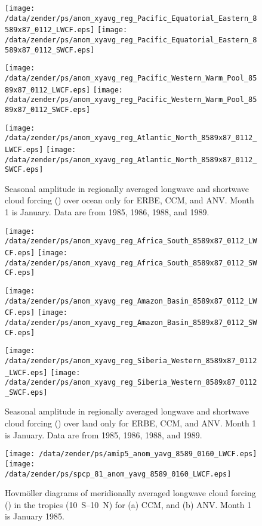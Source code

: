 \documentclass[agupp]{aguplus}
\begin{document}
\begin{figure*}
\centering
\texttt{[image: /data/zender/ps/anom\_xyavg\_reg\_Pacific\_Equatorial\_Eastern\_8589x87\_0112\_LWCF.eps]}%
\texttt{[image: /data/zender/ps/anom\_xyavg\_reg\_Pacific\_Equatorial\_Eastern\_8589x87\_0112\_SWCF.eps]}%

\texttt{[image: /data/zender/ps/anom\_xyavg\_reg\_Pacific\_Western\_Warm\_Pool\_8589x87\_0112\_LWCF.eps]}%
\texttt{[image: /data/zender/ps/anom\_xyavg\_reg\_Pacific\_Western\_Warm\_Pool\_8589x87\_0112\_SWCF.eps]}%

\texttt{[image: /data/zender/ps/anom\_xyavg\_reg\_Atlantic\_North\_8589x87\_0112\_LWCF.eps]}%
\texttt{[image: /data/zender/ps/anom\_xyavg\_reg\_Atlantic\_North\_8589x87\_0112\_SWCF.eps]}%
\caption{Seasonal amplitude in regionally averaged longwave and
shortwave cloud forcing (\wxmS ) over ocean only for ERBE, CCM, and
ANV. 
Month 1 is January.  
Data are from 1985, 1986, 1988, and 1989.
\label{fig:anom_xyavg_reg_8589x87_0112_ocean}}   
\end{figure*}

\begin{figure*}
\centering
\texttt{[image: /data/zender/ps/anom\_xyavg\_reg\_Africa\_South\_8589x87\_0112\_LWCF.eps]}%
\texttt{[image: /data/zender/ps/anom\_xyavg\_reg\_Africa\_South\_8589x87\_0112\_SWCF.eps]}%

\texttt{[image: /data/zender/ps/anom\_xyavg\_reg\_Amazon\_Basin\_8589x87\_0112\_LWCF.eps]}%
\texttt{[image: /data/zender/ps/anom\_xyavg\_reg\_Amazon\_Basin\_8589x87\_0112\_SWCF.eps]}%

\texttt{[image: /data/zender/ps/anom\_xyavg\_reg\_Siberia\_Western\_8589x87\_0112\_LWCF.eps]}%
\texttt{[image: /data/zender/ps/anom\_xyavg\_reg\_Siberia\_Western\_8589x87\_0112\_SWCF.eps]}%
\caption{Seasonal amplitude in regionally averaged longwave and
shortwave cloud forcing (\wxmS ) over land only for ERBE, CCM, and
ANV. 
Month 1 is January.
Data are from 1985, 1986, 1988, and 1989.
\label{fig:anom_xyavg_reg_8589x87_0112_land}}   
\end{figure*}

\begin{figure*}
\centering
\texttt{[image: /data/zender/ps/amip5\_anom\_yavg\_8589\_0160\_LWCF.eps]}%
\texttt{[image: /data/zender/ps/spcp\_81\_anom\_yavg\_8589\_0160\_LWCF.eps]}%
\caption{Hovm\"oller diagrams of meridionally averaged longwave cloud
forcing (\wxmS ) in the tropics (10~\degreee S--10~\degreee N) for
(a) CCM, and (b) ANV.
Month 1 is January 1985.  
\label{fig:anom_yavg_8589_0160_a}}
\end{figure*}
\end{document}
